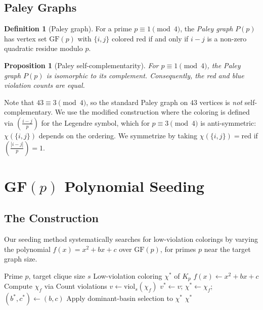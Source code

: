 \documentclass[12pt,a4paper]{article}
\newtheorem{proposition}[theorem]{Proposition}
\theoremstyle{definition}
\newtheorem{definition}[theorem]{Definition}
\theoremstyle{remark}
\newcommand{\GF}[1]{\mathrm{GF}(#1)}
\newcommand{\Kn}[1]{K_{#1}}
\newcommand{\viol}{\mathrm{viol}}
\begin{document}
\subsection{Paley Graphs}

\begin{definition}[Paley graph]\label{def:paley}
For a prime $p \equiv 1 \pmod{4}$, the \emph{Paley graph} $P(p)$ has vertex set $\GF{p}$ with $\{i,j\}$ colored red if and only if $i - j$ is a non-zero quadratic residue modulo $p$.
\end{definition}

\begin{proposition}[Paley self-complementarity]\label{prop:paleyself}
For $p \equiv 1 \pmod{4}$, the Paley graph $P(p)$ is isomorphic to its complement.  Consequently, the red and blue violation counts are equal.
\end{proposition}

Note that $43 \equiv 3 \pmod{4}$, so the standard Paley graph on $43$ vertices is \emph{not} self-complementary.  We use the modified construction where the coloring is defined via $\left(\frac{i-j}{p}\right)$ for the Legendre symbol, which for $p \equiv 3 \pmod{4}$ is anti-symmetric: $\chi(\{i,j\})$ depends on the ordering.  We symmetrize by taking $\chi(\{i,j\}) = \text{red}$ if $\left(\frac{|i-j|}{p}\right) = 1$.


\section{GF$(p)$ Polynomial Seeding}\label{sec:gfp}

\subsection{The Construction}

Our seeding method systematically searches for low-violation colorings by varying the polynomial $f(x) = x^2 + bx + c$ over $\GF{p}$, for primes $p$ near the target graph size.

\begin{algorithm}[H]
\caption{GF$(p)$ Polynomial Seeding}\label{alg:gfp}
\begin{algorithmic}[1]
\Require Prime $p$, target clique size $s$
\Ensure Low-violation coloring $\chi^*$ of $\Kn{p}$
        \State $f(x) \gets x^2 + bx + c$
        \State Compute $\chi_f$ via 
        \State Count violations $v \gets \viol_s(\chi_f)$
            \State $v^* \gets v$; $\chi^* \gets \chi_f$; $(b^*, c^*) \gets (b, c)$
        \EndIf
    \EndFor
\EndFor
\State Apply dominant-basin selection to $\chi^*$
\State \Return $\chi^*$
\end{algorithmic}
\end{algorithm}
\end{document}
